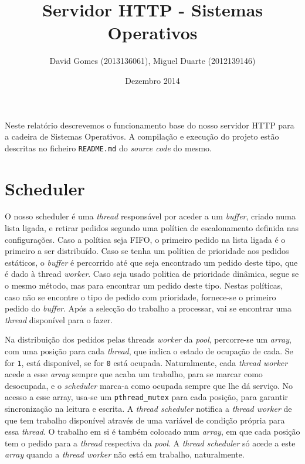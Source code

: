 \documentclass[12pt]{article}
\title{Servidor HTTP - Sistemas Operativos}
\author{David Gomes (2013136061), Miguel Duarte (2012139146)}
\date{Dezembro 2014}
\begin{document}
\maketitle

Neste relatório descrevemos o funcionamento base do nosso servidor HTTP
para a cadeira de Sistemas Operativos. A compilação e execução do projeto
estão descritas no ficheiro \texttt{README.md} do \textit{source code} do
mesmo.

\section{Scheduler}
O nosso scheduler é uma \textit{thread} responsável por aceder a um \textit{buffer}, criado numa lista ligada, e retirar pedidos segundo uma política de escalonamento definida nas configurações. Caso a política seja FIFO, o primeiro pedido na lista ligada é o primeiro a ser distribuído. Caso se tenha um política de prioridade aos pedidos estáticos, o \textit{buffer} é percorrido até que seja encontrado um pedido deste tipo, que é dado à thread \textit{worker}. Caso seja usado politica de prioridade dinâmica, segue se o mesmo método, mas para encontrar um pedido deste tipo. Nestas políticas, caso não se encontre o tipo de pedido com prioridade, fornece-se o primeiro pedido do \textit{buffer}. Após a selecção do trabalho a processar, vai se encontrar uma \textit{thread} disponível para o fazer.

Na distribuição dos pedidos pelas threads \textit{worker} da \textit{pool}, percorre-se um \textit{array}, com uma posição para cada \textit{thread}, que indica o estado de ocupação de cada. Se for \texttt{1}, está disponível, se for \texttt{0} está ocupada. Naturalmente, cada \textit{thread worker} acede a esse \textit{array} sempre que acaba um trabalho, para se marcar como desocupada, e o \textit{scheduler} marca-a como ocupada sempre que lhe dá serviço. No acesso a esse array, usa-se um \texttt{pthread\_mutex} para cada posição, para garantir sincronização na leitura e escrita. A \textit{thread scheduler} notifica a \textit{thread worker} de que tem trabalho disponível através de uma variável de condição própria para essa \textit{thread}. O trabalho em si é também colocado num \textit{array}, em que cada posição tem o pedido para a \textit{thread} respectiva da \textit{pool}. A \textit{thread scheduler} só acede a este \textit{array} quando a \textit{thread worker} não está em trabalho, naturalmente.

\pagebreak
\end{document}
